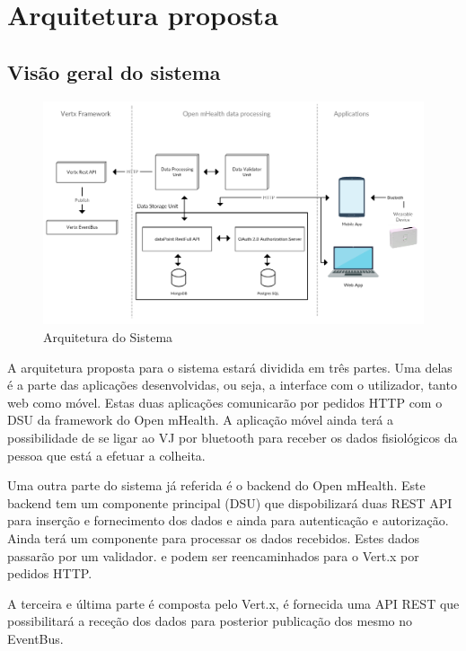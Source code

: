 \chapter{Arquitetura proposta}

\section{Visão geral do sistema}


\begin{figure}[H]
  \centering
  \includegraphics[width=1\textwidth]{imgs/arch-product.png}
  \caption[Arquitetura do Sistema]{Arquitetura do Sistema}
  
  \label{f:product-arch}
\end{figure}

A arquitetura proposta para o sistema estará dividida em três partes. Uma delas é a parte das aplicações desenvolvidas, ou seja, a interface com o utilizador, tanto web como móvel. Estas duas aplicações comunicarão por pedidos \gls{HTTP} com o \gls{DSU} da framework do Open mHealth. A aplicação móvel ainda terá a possibilidade de se ligar ao \gls{VJ} por bluetooth para receber os dados fisiológicos da pessoa que está a efetuar a colheita.
\par 
Uma outra parte do sistema já referida é o backend do Open mHealth. Este backend tem um componente principal (\gls{DSU}) que dispobilizará duas \gls{REST} \gls{API} para inserção e fornecimento dos dados e ainda para autenticação e autorização. Ainda terá um componente para processar os dados recebidos. Estes dados passarão por um validador. e podem ser reencaminhados para o Vert.x por pedidos \gls{HTTP}.
\par
A terceira e última parte é composta pelo Vert.x, é fornecida uma \gls{API} \gls{REST} que possibilitará a receção dos dados para posterior publicação dos mesmo no EventBus.

